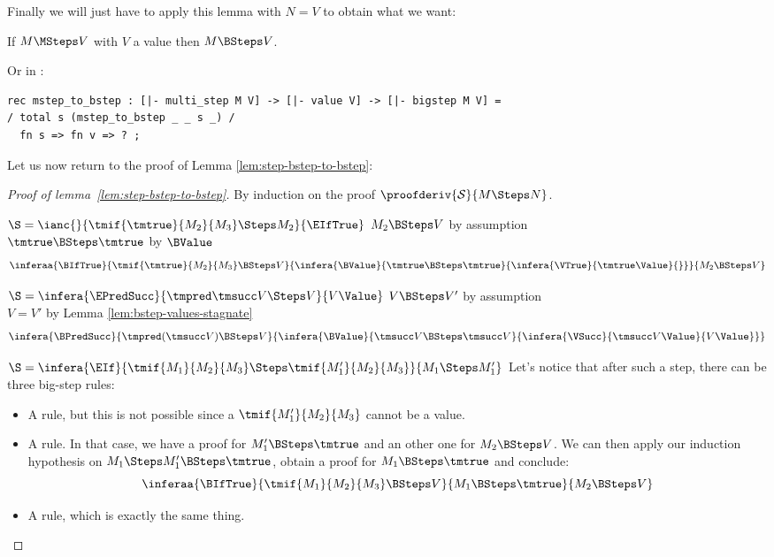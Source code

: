 Finally we will just have to apply this lemma with $N = V$ to obtain what we
want:

\begin{proposition}\label{prop:mstep-to-bstep}
  If $M \MSteps V$ with $V$ a value then $M \BSteps V$.
\end{proposition}

Or in \beluga:

\begin{lstlisting}
rec mstep_to_bstep : [|- multi_step M V] -> [|- value V] -> [|- bigstep M V] =
/ total s (mstep_to_bstep _ _ s _) /
  fn s => fn v => ? ;
\end{lstlisting}


Let us now return to the proof of Lemma \ref{lem:step-bstep-to-bstep}:

\begin{proof}[Proof of lemma~\ref{lem:step-bstep-to-bstep}]

By induction on the proof $\proofderiv{\mathcal{S}}{M \Steps N}$.

\begin{case}{$\S = \ianc{}{\tmif{\tmtrue}{M_2}{M_3} \Steps  M_2}{\EIfTrue}$}
$M_2 \BSteps V$ \hfill by assumption \\
$\tmtrue \BSteps \tmtrue$ \hfill by $\BValue$\\

    \[ \inferaa{\BIfTrue}{\tmif{\tmtrue}{M_2}{M_3} \BSteps V}{\infera{\BValue}{\tmtrue \BSteps \tmtrue}{\infera{\VTrue}{\tmtrue \Value}{}}}{M_2 \BSteps V} \]
\end{case}

\begin{case}{$\S = \infera{\EPredSucc}{\tmpred \tmsucc V \Steps V}{V \Value}$}
$V \BSteps V'$ \hfill by assumption \\
$V = V'$ \hfill by Lemma \ref{lem:bstep-values-stagnate} \\

    \[ \infera{\BPredSucc}{\tmpred (\tmsucc V) \BSteps V}{\infera{\BValue}{\tmsucc V \BSteps \tmsucc V}{\infera{\VSucc}{\tmsucc V \Value}{V \Value}}} \]
\end{case}

\begin{case}{$\S = \infera{\EIf}{\tmif{M_1}{M_2}{M_3} \Steps \tmif{M_1'}{M_2}{M_3}}{M_1 \Steps M_1'}$}
    Let's notice that after such a step, there can be three big-step rules:
    \begin{itemize}
      \item A \BValue rule, but this is not possible since a $\tmif{M_1'}{M_2}{M_3}$ cannot be a
        value.
      \item A \BIfTrue rule. In that case, we have a proof for
        $M_1' \BSteps \tmtrue$ and an other one for $M_2 \BSteps V$. We can then
        apply our induction hypothesis on $M_1 \Steps M_1' \BSteps \tmtrue$,
        obtain a proof for $M_1 \BSteps \tmtrue$ and conclude:
        \[ \inferaa{\BIfTrue}{\tmif{M_1}{M_2}{M_3} \BSteps V}{M_1 \BSteps \tmtrue}{M_2 \BSteps V} \]
      \item A \BIfFalse rule, which is exactly the same thing.
    \end{itemize}
\end{case}


\end{proof}

